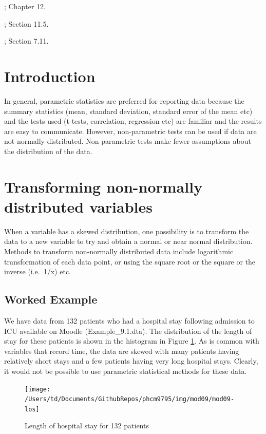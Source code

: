 \documentclass[
]{memoir}
\begin{document}
\citet{bland15}; Chapter 12.

\citet{juul_frydenberg14}; Section 11.5.

\citet{acock10}; Section 7.11.

\hypertarget{introduction-8}{%
\section{Introduction}\label{introduction-8}}

In general, parametric statistics are preferred for reporting data because the summary statistics (mean, standard deviation, standard error of the mean etc) and the tests used (t-tests, correlation, regression etc) are familiar and the results are easy to communicate. However, non-parametric tests can be used if data are not normally distributed. Non-parametric tests make fewer assumptions about the distribution of the data.

\hypertarget{transforming-non-normally-distributed-variables}{%
\section{Transforming non-normally distributed variables}\label{transforming-non-normally-distributed-variables}}

When a variable has a skewed distribution, one possibility is to transform the data to a new variable to try and obtain a normal or near normal distribution. Methods to transform non-normally distributed data include logarithmic transformation of each data point, or using the square root or the square or the inverse (i.e.~1/x) etc.

\hypertarget{worked-example-12}{%
\subsection{Worked Example}\label{worked-example-12}}

We have data from 132 patients who had a hospital stay following admission to ICU available on Moodle (Example\_9.1.dta). The distribution of the length of stay for these patients is shown in the histogram in Figure \ref{fig:mod09-los}. As is common with variables that record time, the data are skewed with many patients having relatively short stays and a few patients having very long hospital stays. Clearly, it would not be possible to use parametric statistical methods for these data.

\begin{figure}
\texttt{[image: /Users/td/Documents/GithubRepos/phcm9795/img/mod09/mod09-los]} \caption{Length of hospital stay for 132 patients}\label{fig:mod09-los}
\end{figure}
\end{document}
